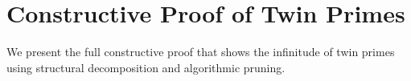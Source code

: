 \section*{Constructive Proof of Twin Primes}
We present the full constructive proof that shows the infinitude of twin primes using structural decomposition and algorithmic pruning.